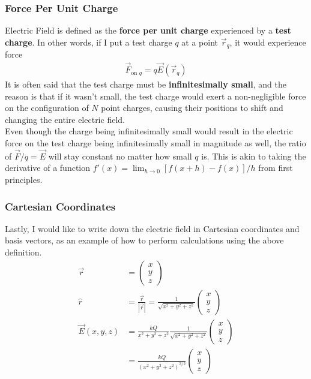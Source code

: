 \documentclass{article}
\begin{document}
\subsubsection{Force Per Unit Charge}
Electric Field is defined as the \textbf{force per unit charge} experienced by a \textbf{test charge}. In other words, if I put a test charge $q$ at a point $\vec{r}_q$, it would experience force 
\begin{align}
    \vec{F}_{\text{on }q} = q\vec{E}(\vec{r}_q)
\end{align}
It is often said that the test charge must be \textbf{infinitesimally small}, and the reason is that if it wasn't small, the test charge would exert a non-negligible force on the configuration of $N$ point charges, causing their positions to shift and changing the entire electric field. \\[10pt]
Even though the charge being infinitesimally small would result in the electric force on the test charge being infinitesimally small in magnitude as well, the ratio of $\vec{F} / q = \vec{E}$ will stay constant no matter how small $q$ is. This is akin to taking the derivative of a function $f'(x) = \lim_{h\rightarrow 0} [f(x+h)-f(x)]/h$ from first principles. 
\subsubsection{Cartesian Coordinates}
Lastly, I would like to write down the electric field in Cartesian coordinates and basis vectors, as an example of how to perform calculations using the above definition.
\begin{align}
    \vec{r} &= \left(\begin{array}{c}
         x \\
         y \\
         z 
    \end{array}\right) \\
    \hat{r} &= \frac{\vec{r}}{|\vec{r}|} = \frac{1}{\sqrt{x^2 + y^2 + z^2}} \left(\begin{array}{c}
         x \\
         y \\
         z 
    \end{array}\right)\\
    \vec{E}(x,y,z) &= \frac{kQ}{x^2 + y^2 + z^2} \frac{1}{\sqrt{x^2 + y^2 + z^2}} \left(\begin{array}{c}
         x \\
         y \\
         z 
    \end{array}\right) \\
    &= \frac{kQ}{(x^2 + y^2 + z^2)^{3/2}} \left(\begin{array}{c}
         x \\
         y \\
         z 
    \end{array}\right) 
\end{align}
\end{document}
